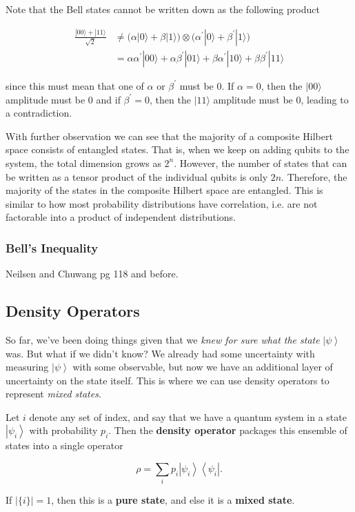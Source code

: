 \documentclass{article}
\newcommand{\ket}[1]{\ensuremath{\left|#1\right\rangle}}
\newcommand{\bra}[1]{\ensuremath{\left\langle#1\right|}}
\begin{document}
    Note that the Bell states cannot be written down as the following product

    \begin{align*}
      \frac{|00\rangle + |11 \rangle}{\sqrt{2}} & \neq \big(\alpha |0\rangle + \beta |1\rangle \big) \otimes \big( \alpha^\prime |0 \rangle + \beta^\prime |1\rangle \big) \\
      & = \alpha \alpha^\prime |00\rangle + \alpha \beta^\prime |01\rangle + \beta \alpha^\prime |10\rangle + \beta \beta^\prime |11\rangle
    \end{align*}

    since this must mean that one of $\alpha$ or $\beta^\prime$ must be $0$. If $\alpha = 0$, then the $|00\rangle$ amplitude must be $0$ and if $\beta^\prime = 0$, then the $|11\rangle$ amplitude must be $0$, leading to a contradiction. 

    With further observation we can see that the majority of a composite Hilbert space consists of entangled states. That is, when we keep on adding qubits to the system, the total dimension grows as $2^n$. However, the number of states that can be written as a tensor product of the individual qubits is only $2n$. Therefore, the majority of the states in the composite Hilbert space are entangled. This is similar to how most probability distributions have correlation, i.e. are not factorable into a product of independent distributions. 

    \subsubsection{Bell's Inequality} 

      Neilsen and Chuwang pg 118 and before. 

  \subsection{Density Operators} 

    So far, we've been doing things given that we \textit{knew for sure what the state } $\ket{\psi}$ was. But what if we didn't know? We already had some uncertainty with measuring $\ket{\psi}$ with some observable, but now we have an additional layer of uncertainty on the state itself. This is where we can use density operators to represent \textit{mixed states}. 

    \begin{definition}
      Let $i$ denote any set of index, and say that we have a quantum system in a state $\ket{\psi_i}$ with probability $p_i$. Then the \textbf{density operator} packages this ensemble of states into a single operator

        \[\rho = \sum_i p_i \ket{\psi_i} \bra{\psi_i}.\]

      If $|\{i\}| = 1$, then this is a \textbf{pure state}, and else it is a \textbf{mixed state}. 
    \end{definition}
\end{document}
